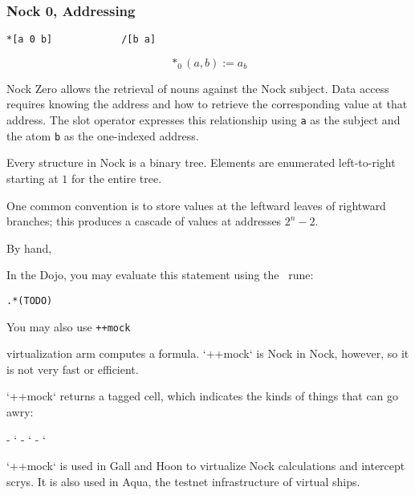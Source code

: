 \subsubsection[Nock 0]{Nock 0, Addressing}

\begin{lstlisting}[style=nonumbers]
*[a 0 b]            /[b a]
\end{lstlisting}

$$
*_{0}(a,b) := a_{b}
$$

Nock Zero allows the retrieval of nouns against the Nock subject.  Data access requires knowing the address and how to retrieve the corresponding value at that address.  The slot operator expresses this relationship using \texttt{a} as the subject and the atom \texttt{b} as the one-indexed address.

Every structure in Nock is a binary tree.  Elements are enumerated left-to-right starting at $1$ for the entire tree.


One common convention is to store values at the leftward leaves of rightward branches; this produces a cascade of values at addresses $2^{n}-2$.





By hand,



In the Dojo, you may evaluate this statement using the \pdottar~rune:

\begin{lstlisting}[style=nonumbers]
.*(TODO)
\end{lstlisting}

You may also use \texttt{++mock}

virtualization arm computes a formula.  `++mock` is Nock in Nock, however, so it is not very fast or efficient.

`++mock` returns a tagged cell, which indicates the kinds of things that can go awry:

- `%
- `%
- `%

`++mock` is used in Gall and Hoon to virtualize Nock calculations and intercept scrys.  It is also used in Aqua, the testnet infrastructure of virtual ships.

